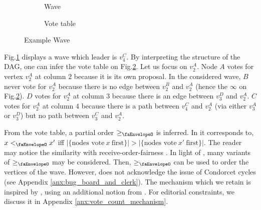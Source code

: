 \begin{figure}[h]
\vspace*{-.4cm}
    \centering

\begin{subfigure}{.24\textwidth}
    \centering
    \scalebox{.85}{}
    \caption{Wave}
    \label{fig:ex_full_wave}
\end{subfigure}
%
\begin{subfigure}{.23\textwidth}
    \centering
    \scalebox{.7}{}
    \caption{Vote table}
    \label{fig:ex_full_table}
\end{subfigure}
    \caption{Example Wave}
    \label{fig:do_example_1}
\vspace*{-.4cm}
\end{figure}


Fig.\ref{fig:ex_full_wave} displays a wave which leader is $v^C_4$.
By interpreting the structure of the DAG, one can infer the vote table on Fig.\ref{fig:ex_full_table}.
Let us focus on $v_2^A$. Node $A$ votes for vertex $v_2^A$ at column $2$ because it is its own proposal. 
In the considered wave, $B$ never vote for $v_2^A$ because there is no edge between $v_2^B$ and $v_2^A$ (hence the $\infty$ on Fig.\ref{fig:ex_full_table}). 
$D$ votes for $v_2^A$ at column $3$ because there is an edge between $v_3^D$ and $v_2^A$. 
$C$ votes for $v_2^A$ at column $4$ because there is a path between $v_4^C$ and $v_2^A$ (via either $v_3^A$ or $v_3^D$) but no path between $v_3^C$ and $v_2^A$.


From the vote table, a partial order $\geq_{\text{\faEnvelopeO}}$ is inferred.
In \cite{reducing_latency_of_dag_based_consensus_in_the_asynchronous_setting_via_the_utxo_model} it corresponds to, $x <_{\text{\faEnvelopeO}} x'$ iff $|\{\text{nodes vote}~x~\text{first}\}| > |\{\text{nodes vote}~x'~\text{first}\}|$.
The reader may notice the similarity with receive-order-fairness \cite{order_fairness_for_byzantine_consensus}.
In light of \cite{order_fairness_for_byzantine_consensus,quick_order_fairness,themis_fast_strong_order_fairness_in_byzantine_consensus}, many variants of $\geq_{\text{\faEnvelopeO}}$ may be considered.
Then, $\geq_{\text{\faEnvelopeO}}$ can be used to order the vertices of the wave.
However, \cite{reducing_latency_of_dag_based_consensus_in_the_asynchronous_setting_via_the_utxo_model} does not acknowledge the issue of Condorcet cycles (see Appendix \ref{anx:bug_board_and_clerk}).
The mechanism which we retain is inspired by \cite{order_fairness_for_byzantine_consensus,themis_fast_strong_order_fairness_in_byzantine_consensus}, using an additional notion from \cite{diversified_top_k_graph_pattern_matching}.
For editorial constraints, we discuss it in Appendix \ref{anx:vote_count_mechanism}.



